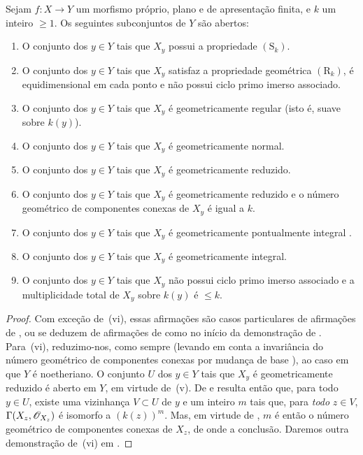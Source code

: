 \begin{theorem}[12.2.4]
\label{IV.12.2.4}
Sejam $f:X\to Y$ um morfismo
próprio, plano e de apresentação
finita, e $k$ um inteiro
$\geqslant 1$. Os seguintes
subconjuntos de $Y$ são abertos:
\begin{enumerate}[label=(\roman*)]
\item O conjunto dos $y\in Y$
tais que $X_y$ possui a
propriedade $(\mathrm{S}_k)$.
\item O conjunto dos $y\in Y$
tais que $X_y$ satisfaz a
propriedade geométrica
$(\mathrm{R}_k)$, é
equidimensional em cada ponto
e não possui ciclo primo
imerso associado.
\item O conjunto dos $y\in Y$
tais que $X_y$ é
geometricamente regular
(isto é, suave sobre $k(y)$).
\item O conjunto dos $y\in Y$
tais que $X_y$ é
geometricamente normal.
\item O conjunto dos $y\in Y$
tais que $X_y$ é
geometricamente reduzido.
\item O conjunto dos $y\in Y$
tais que $X_y$ é
geometricamente reduzido e
o número geométrico de
componentes conexas de $X_y$
é igual a $k$.
\item O conjunto dos $y\in Y$
tais que $X_y$ é
geometricamente pontualmente
integral .
\item O conjunto dos $y\in Y$
tais que $X_y$ é
geometricamente integral.
\item O conjunto dos $y\in Y$
tais que $X_y$ não possui
ciclo primo imerso associado
e a multiplicidade total
 de $X_y$
sobre $k(y)$ é $\leqslant k$.
\end{enumerate}
\end{theorem}

\begin{proof}
Com exceção de~(vi), essas
afirmações são casos particulares
de afirmações de
, ou se deduzem
de afirmações de
 como no início
da demonstração de
. Para~(vi),
reduzimo-nos, como sempre
(levando em conta a invariância
do número geométrico de
componentes conexas por mudança
de base ),
ao caso em que $Y$ é noetheriano.
O conjunto $U$ dos $y\in Y$
tais que $X_y$ é geometricamente
reduzido é aberto em $Y$, em
virtude de~(v). De
 e
 resulta
então que, para todo $y\in U$,
existe uma vizinhança
$V\subset U$ de $y$ e um
inteiro $m$ tais que, para
\emph{todo} $z\in V$,
$\Gamma(X_z,\mathscr{O}_{X_z})$
é isomorfo a $(k(z))^m$.
Mas, em virtude de
, $m$
é então o número geométrico
de componentes conexas de
$X_z$, de onde a conclusão.
Daremos outra demonstração
de~(vi) em .
\end{proof}

